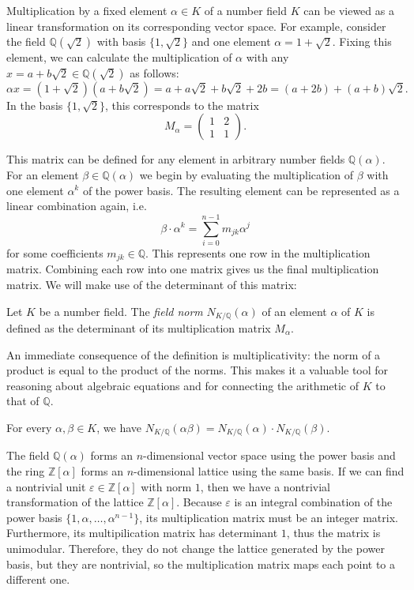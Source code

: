 Multiplication by a fixed element $α ∈ K$ of a number field $K$ can be viewed
as a linear transformation on its corresponding vector space.
For example, consider the field $ℚ(\sqrt{2})$ with basis $\{1, \sqrt{2}\}$
and one element $α = 1 + \sqrt{2}$.
Fixing this element, we can calculate the multiplication of $α$ with any $x = a
+ b \sqrt{2} ∈ ℚ(\sqrt{2})$ as follows:
\[
  αx = (1 + \sqrt{2})(a + b \sqrt{2}) = a + a \sqrt{2} + b \sqrt{2} + 2b = (a + 2b) + (a + b)\sqrt{2}.
\]
In the basis $\{1, \sqrt{2}\}$, this corresponds to the matrix
\[
  M_α =
  \begin{pmatrix}
    1 & 2 \\
    1 & 1
  \end{pmatrix}.
\]

This matrix can be defined for any element in arbitrary number fields $ℚ(α)$.
For an element $β ∈ ℚ(α)$ we begin by evaluating the
multiplication of $β$ with one element $α^k$ of the power basis.
The resulting element can be represented as a linear combination again,
i.e.
\[
  β · α^k = \sum_{i=0}^{n-1} m_{jk} α^j
\]
for some coefficients $m_{jk} ∈ ℚ$.
This represents one row in the multiplication matrix.
Combining each row into one matrix gives us the final multiplication matrix.
We will make use of the determinant of this matrix:

\begin{definition}
  Let $K$ be a number field.
  The \emph{field norm} $N_{K/ℚ}(α)$ of an element $α$ of $K$ is defined as the
  determinant of its multiplication matrix $M_α$.
\end{definition}

An immediate consequence of the definition is multiplicativity:
the norm of a product is equal to the product of the norms.
This makes it a valuable tool for reasoning about algebraic equations
and for connecting the arithmetic of $K$ to that of $ℚ$.

\begin{lemma}
  For every $α, β ∈ K$, we have $N_{K/ℚ}(αβ) = N_{K/ℚ}(α) · N_{K/ℚ}(β)$.
\end{lemma}

The field $ℚ(α)$ forms an $n$-dimensional vector space using the power basis
and the ring $ℤ[α]$ forms an $n$-dimensional lattice using the same basis.
If we can find a nontrivial unit $ε ∈ ℤ[α]$ with norm $1$,
then we have a nontrivial transformation of the lattice $ℤ[α]$.
Because $ε$ is an integral combination of the power basis $\{1, α, …, α^{n-1}\}$,
its multiplication matrix must be an integer matrix.
Furthermore, its multipilication matrix has determinant $1$,
thus the matrix is unimodular.
Therefore, they do not change the lattice generated by the power basis,
but they are nontrivial, so the multiplication matrix maps each point to a
different one.

